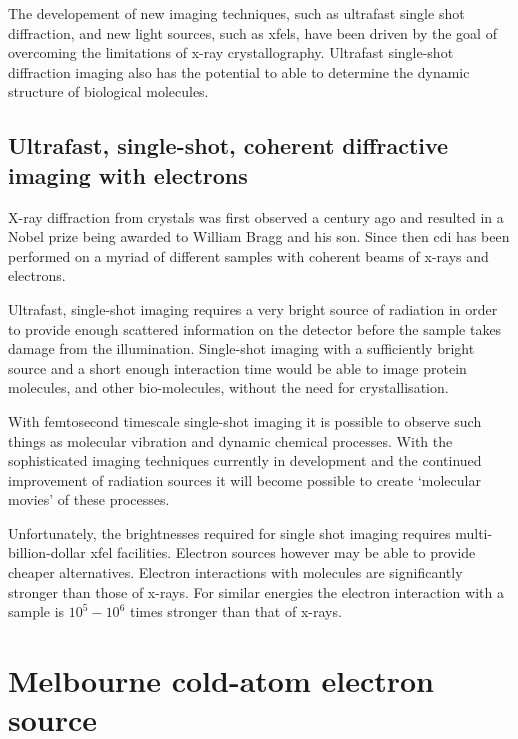 The developement of new imaging techniques, such as ultrafast single shot diffraction, and new light sources, such as \glspl{xfel}, have been driven by the goal of overcoming the limitations of x-ray crystallography. Ultrafast single-shot diffraction imaging also has the potential to able to determine the dynamic structure of biological molecules.



\subsection{Ultrafast, single-shot, coherent diffractive imaging with electrons}

X-ray diffraction from crystals was first observed a century ago\cite{bragg_x-rays_1912} and resulted in a Nobel prize being awarded to William Bragg and his son. Since then \gls{cdi} has been performed on a myriad of different samples with coherent beams of x-rays and electrons.

Ultrafast, single-shot imaging requires a very bright source of radiation in order to provide enough scattered information on the detector before the sample takes damage from the illumination\cite{henderson_potential_1995}. Single-shot imaging with a sufficiently bright source and a short enough interaction time would be able to image protein molecules, and other bio-molecules, without the need for crystallisation\cite{neutze_potential_2000}.

With femtosecond timescale single-shot imaging it is possible to observe such things as molecular vibration and dynamic chemical processes\cite{zewail_4d_2006}. With the sophisticated imaging techniques currently in development and the continued improvement of radiation sources it will become possible to create `molecular movies'\cite{dwyer_femtosecond_2006} of these processes.

Unfortunately, the brightnesses required for single shot imaging requires multi-billion-dollar \gls{xfel} facilities. Electron sources however may be able to provide cheaper alternatives. Electron interactions with molecules are significantly stronger than those of x-rays. For similar energies the electron interaction with a sample is $10^5-10^6$ times stronger than that of x-rays\cite{sciaini_femtosecond_2011}.

\section{Melbourne cold-atom electron source}

